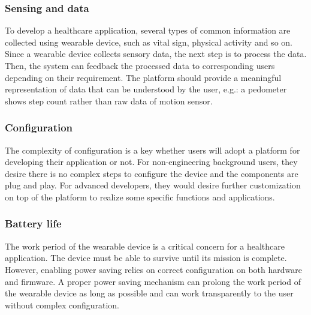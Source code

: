 \vspace{10pt}
\subsubsection{Sensing and data}
To develop a healthcare application, several types of common information are collected using wearable device, such as vital sign, physical activity and so on. Since a wearable device collects sensory data, the next step is to process the data. Then, the system can feedback the processed data to corresponding users depending on their requirement. The platform should provide a meaningful representation of data that can be understood by the user, e.g.: a pedometer shows step count rather than raw data of motion sensor.

\vspace{10pt}
\subsubsection{Configuration}
The complexity of configuration is a key whether users will adopt a platform for developing their application or not. For non-engineering background users, they desire there is no complex steps to configure the device and the components are plug and play. For advanced developers, they would desire further customization on top of the platform to realize some specific functions and applications. 

\vspace{10pt}
\subsubsection{Battery life}
The work period of the wearable device is a critical concern for a healthcare application. The device must be able to survive until its mission is complete. However, enabling power saving relies on correct configuration on both hardware and firmware. A proper power saving mechanism can prolong the work period of the wearable device as long as possible and can work transparently to the user without complex configuration.


